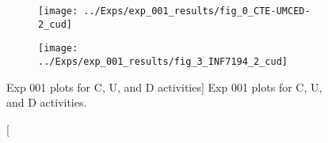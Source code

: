 \begin{figure}[h!]
    \centering

    \begin{subfigure}{.5\textwidth}
        \centering
        \texttt{[image: ../Exps/exp\_001\_results/fig\_0\_CTE-UMCED-2\_cud]}
        \label{subfig:exp_001_0_cud}
    \end{subfigure}%
    \begin{subfigure}{.5\textwidth}
        \centering
        \texttt{[image: ../Exps/exp\_001\_results/fig\_3\_INF7194\_2\_cud]}
        \label{subfig:exp_001_3_cud}
    \end{subfigure}

    \caption
        [Exp 001 plots for C, U, and D activities]
        {Exp 001 plots for C, U, and D activities.}

    \label{fig:exp_001_cud}
\end{figure}
